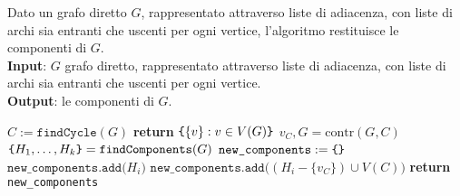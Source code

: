 \documentclass[14pt]{extreport}
\theoremstyle{definition}
\theoremstyle{definition}
\begin{document}
\begin{algorithm}[H]
    \caption{
        Dato un grafo diretto $G$, rappresentato attraverso liste di adiacenza, con liste di archi sia entranti che uscenti per ogni vertice, l'algoritmo restituisce le componenti di $G$.\\
        \textbf{Input}: $G$ grafo diretto, rappresentato attraverso liste di adiacenza, con liste di archi sia entranti che uscenti per ogni vertice.\\
        \textbf{Output}: le componenti di $G$.
    }

    \begin{algorithmic}[1]
            \State $C := \texttt{findCycle}(G)$
                \State \textbf{return} $\verb|{|\{v\} : v \in V(G)\verb|}|$ 
            \Else
                \State $v_C, G = \mathrm{contr}(G, C)$ 
                \State $\verb|{|H_1, \ldots, H_k\verb|}| = \texttt{findComponents}(G)$
                \State $\texttt{new\_components} := \verb|{|\verb|}|$ 
                        \State $\texttt{new\_components.add(}H_i\texttt{)}$
                    \Else
                    \State $\texttt{new\_components.add(}(H_i - \{v_C\}) \cup V(C)\texttt{)}$
                    \EndIf
                \EndFor
            \EndIf
            \State \textbf{return} \texttt{new\_components}
        \EndFunction
    \end{algorithmic}
\end{algorithm}
\end{document}
